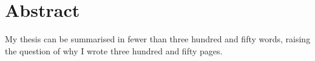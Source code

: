 \chapter*{Abstract}
%
%
My thesis can be summarised in fewer than three hundred and fifty words, raising the question of why I wrote three hundred and fifty pages. 
